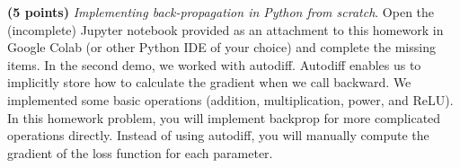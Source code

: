 \noindent {} 
\textbf{(5 points)} \textit{Implementing back-propagation in Python from scratch}. Open the (incomplete) Jupyter notebook provided as an attachment to this homework in Google Colab (or other Python IDE of your choice) and complete the missing items. In the second demo, we worked with autodiff. Autodiff enables us to implicitly store how to calculate the gradient when we call backward. We implemented some basic operations (addition, multiplication, power, and ReLU). In this homework problem, you will implement backprop for more complicated operations directly. Instead of using autodiff, you will manually compute the gradient of the loss function for each parameter.